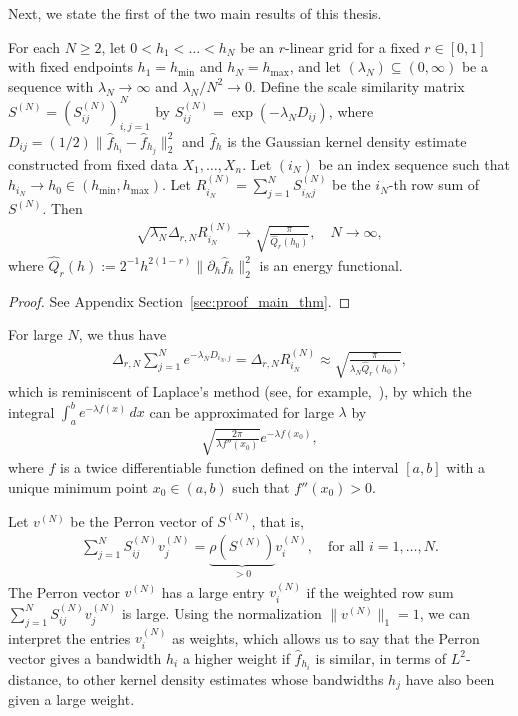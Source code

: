 Next, we state the first of the two main results of this thesis.

\begin{Prop}\label{prop:main_thm}
    For each $N\ge2$, let $0<h_1<\dots<h_N$ be an $r$-linear grid for a fixed $r\in[0,1]$ with fixed endpoints $h_1=h_{\min}$ and $h_N=h_{\max}$, and let $(\lambda_N)\subseteq(0,\infty)$ be a sequence with $\lambda_N\to\infty$ and $\lambda_N/N^2\to0$. Define the scale similarity matrix $S^{(N)}=(S^{(N)}_{ij})_{i,j=1}^{N}$ by $S_{ij}^{(N)}=\exp{(-\lambda_ND_{ij})}$, where $D_{ij}=(1/2)\|\hat{f}_{h_i}-\hat{f}_{h_j}\|_2^2$ and $\hat{f}_h$ is the Gaussian kernel density estimate constructed from fixed data $X_1,\dots,X_n$. Let $(i_N)$ be an index sequence such that $h_{i_N}\to h_0\in(h_{\min},h_{\max})$. Let $R_{i_N}^{(N)}=\sum_{j=1}^{N}S_{i_Nj}^{(N)}$ be the $i_N$-th row sum of $S^{(N)}$. Then
    \begin{align*}
        \sqrt{\lambda_N}\Delta_{r,N}R_{i_N}^{(N)}\to\sqrt{\frac{\pi}{\hat{Q}_r(h_0)}},\quad N\to\infty,
    \end{align*}
    where $\hat{Q}_r(h):=2^{-1}h^{2(1-r)}\|\partial_h\hat{f}_h\|_2^2$ is an energy functional.
\end{Prop}

\begin{proof}
    See Appendix Section~\ref{sec:proof_main_thm}.
\end{proof}

\begin{Rem}
    For large $N$, we thus have
    \begin{align*}
        \Delta_{r,N}\sum_{j=1}^{N}e^{-\lambda_ND_{i_N,j}}=\Delta_{r,N}R_{i_N}^{(N)}\approx\sqrt{\frac{\pi}{\lambda_N\hat{Q}_r(h_0)}},
    \end{align*}
    which is reminiscent of Laplace's method (see, for example,~\cite[Theorem~2.1.2]{ivrii_partial_nodate}), by which the integral $\int_a^be^{-\lambda f(x)}\,dx$ can be approximated for large $\lambda$ by
    \begin{align*}
        \sqrt{\frac{2\pi}{\lambda f''(x_0)}}e^{-\lambda f(x_0)},
    \end{align*}
    where $f$ is a twice differentiable function defined on the interval $[a,b]$ with a unique minimum point $x_0\in(a,b)$ such that $f''(x_0)>0$.
\end{Rem}

Let $v^{(N)}$ be the Perron vector of $S^{(N)}$, that is,
\begin{align}\label{eq:eigenvector_equations_111}
    \sum_{j=1}^{N}S_{ij}^{(N)}v_j^{(N)}=\underbrace{\rho(S^{(N)})}_{>0}v_i^{(N)},\quad\text{for all }i=1,\dots,N.
\end{align}
The Perron vector $v^{(N)}$ has a large entry $v_i^{(N)}$ if the weighted row sum $\sum_{j=1}^{N}S_{ij}^{(N)}v_j^{(N)}$ is large. Using the normalization $\|v^{(N)}\|_1=1$, we can interpret the entries $v_i^{(N)}$ as weights, which allows us to say that the Perron vector gives a bandwidth $h_i$ a higher weight if $\hat{f}_{h_i}$ is similar, in terms of $L^2$-distance, to other kernel density estimates whose bandwidths $h_j$ have also been given a large weight.

